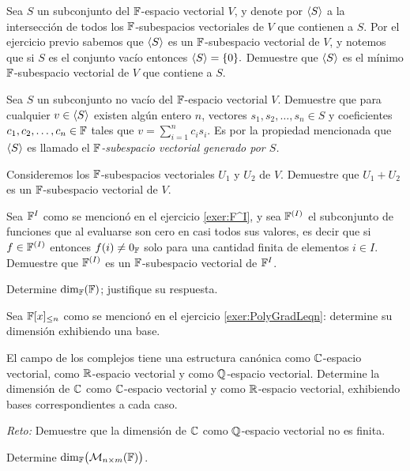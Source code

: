 \begin{exerciselist}
  \item \label{exer:SubEsGene} Sea $S$ un subconjunto del $\mathbb{F}$-espacio vectorial $V$, y denote por $\langle S\rangle$ a la intersección de todos los $\mathbb{F}$-subespacios vectoriales de $V$ que contienen a $S$. Por el ejercicio previo sabemos que $\langle S\rangle$ es un $\mathbb{F}$-subespacio vectorial de $V$, y notemos que si $S$ es el conjunto vacío entonces $\langle S\rangle = \{ 0 \}.$ Demuestre que $\langle S\rangle$ es el mínimo $\mathbb{F}$-subespacio vectorial de $V$ que contiene a $S$.
  
  \item \label{exer:SubEsCombLin} Sea $S$ un subconjunto no vacío del $\mathbb{F}$-espacio vectorial $V$. Demuestre que para cualquier $v \in \langle S\rangle$ existen algún entero $n$, vectores $s_1, s_2, \ldots, s_n \in S$ y coeficientes $c_1, c_2, \ldots, c_n \in \mathbb{F}$ tales que $v = \sum _{i=1}^n c_i s_i$. Es por la propiedad mencionada que $\langle S\rangle$ es llamado el \emph{$\mathbb{F}$-subespacio vectorial generado por $S$.}
  

  \item Consideremos los $\mathbb{F}$-subespacios vectoriales $U_1$ y $U_2$ de $V$. Demuestre que $U_1 + U_2$ es un $\mathbb{F}$-subespacio vectorial de $V$.
  
  \item \label{exer:F^IFinito} Sea $\mathbb{F}^{I}$ como se mencionó en el ejercicio \ref{exer:F^I}, y sea $\mathbb{F}^{(I)}$ el subconjunto de funciones que al evaluarse son cero en casi todos sus valores, es decir que si $f \in \mathbb{F}^{(I)}$ entonces $f(i) \neq 0_{\mathbb{F}}$ solo para una cantidad finita de elementos $i \in I$. Demuestre que $\mathbb{F}^{(I)}$ es un $\mathbb{F}$-subespacio vectorial de $\mathbb{F}^{I}$.
  
  \item Determine $\dim_{\mathbb{F}}(\mathbb{F})$; justifique su respuesta.
  
  \item Sea $\mathbb{F}[x]_{\leq n}$ como se mencionó en el ejercicio \ref{exer:PolyGradLeqn}: determine su dimensión exhibiendo una base.
  
  \item El campo de los complejos tiene una estructura canónica como $\mathbb{C}$-espacio vectorial, como $\mathbb{R}$-espacio vectorial
  y como $\mathbb{Q}$-espacio vectorial. Determine la dimensión de $\mathbb{C}$ como $\mathbb{C}$-espacio vectorial y como $\mathbb{R}$-espacio vectorial, exhibiendo bases correspondientes a cada caso.
  
  \emph{Reto:} Demuestre que la dimensión de $\mathbb{C}$ como $\mathbb{Q}$-espacio vectorial no es finita.
  
  \item Determine $\dim_{\mathbb{F}}\bigl( \mathcal{M}_{n\times m}(\mathbb{F}) \bigr)$.
  

\end{exerciselist}
